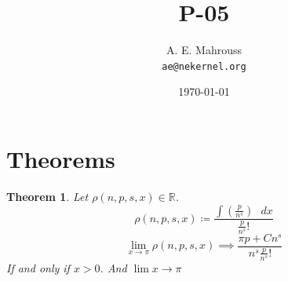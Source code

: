 \documentclass[11pt, a4paper]{article}
\title{P-05}
\author{A. E. Mahrouss\\\texttt{ae@nekernel.org}}
\date{\today}
\theoremstyle{plain}
\newtheorem{theorem}{Theorem}[section]
\theoremstyle{definition}
\theoremstyle{remark}
\begin{document}
\twocolumn[{%
  \maketitle
  \vspace{-0.5em}
  \vspace{0.8em}
  \rule{\linewidth}{0.4pt}
  \vspace{1em}
}]

\maketitle

\section{Theorems}
\begin{theorem}
Let $\rho(n, p, s, x) \in \mathbb{R}$.
\begin{equation}
\rho(n, p, s, x) \coloneq \frac{\int (\frac{p}{n^{s}}) \text{ } dx}{\frac{p}{n^{s}}! }
\end{equation}
\begin{equation}
  \lim_{x \to \pi} \rho(n, p, s, x) \implies \frac{\pi p+Cn^s}{n^s\frac{p}{n^s}!}
\end{equation}
If and only if $x > 0$. And $\lim x \to \pi$
\end{theorem}
\end{document}
